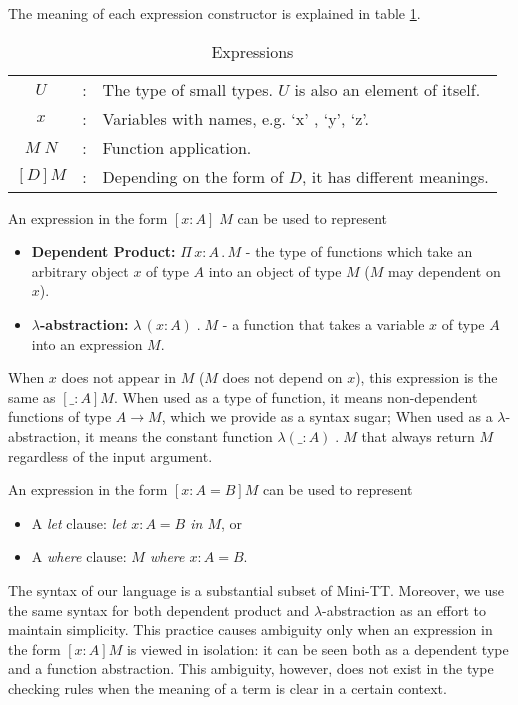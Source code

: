 \documentclass{article}
\theoremstyle{remark}
\begin{document}
The meaning of each expression constructor is explained in table \ref{tab:exp}.

\begin{table}[h]
  \centering
  \begin{tabular}{c l l}
    $U$ & : & The type of small types. $U$ is also an element of itself.\\
    $x$ & : & Variables with names, e.g. `x' , `y', `z'. \\
    $M \; N$ & : & Function application. \\
    $[D] M$ & : & Depending on the form of $D$, it has different meanings. \\ 
  \end{tabular}
  \caption{Expressions}
  \label{tab:exp}
\end{table}

An expression in the form $[x : A]\; M$ can be used to represent
\begin{itemize}
\item \textbf{Dependent Product:} $\Pi \,x : A \, . \, M$ - the type of functions which take an arbitrary object $x$ of type $A$ into an object of type $M$ ($M$ may dependent on $x$).
\item \textbf{$\lambda$-abstraction:} $\lambda\,(x : A) \; . \; M$ - a function that takes a variable $x$ of type $A$ into an expression $M$.
\end{itemize}

When $x$ does not appear in $M$ ($M$ does not depend on $x$), this expression is the same as $[\_ : A] M$. When used as a type of function, it means non-dependent functions of type $A \to M$, which we provide as a syntax sugar; When used as a $\lambda$-abstraction, it means the constant function $\lambda (\_:A) \; . \; M$ that always return $M$ regardless of the input argument.

An expression in the form $[x : A = B] M$ can be used to represent
\begin{itemize}
\item A \textit{let} clause: \textit{let $x : A = B$ in $M$}, or
\item A \textit{where} clause: \textit{$M$ where $x : A = B$}.
\end{itemize}

The syntax of our language is a substantial subset of Mini-TT. Moreover, we use the same syntax for both dependent product and $\lambda$-abstraction as an effort to maintain simplicity. This practice causes ambiguity only when an expression in the form $[x : A] M$ is viewed in isolation: it can be seen both as a dependent type and a function abstraction. This ambiguity, however, does not exist in the type checking rules when the meaning of a term is clear in a certain context.
\end{document}
